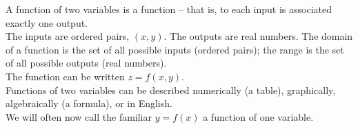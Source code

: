 \begin{tcolorbox}[title = {A Function of Two Variables}]

\noindent A function of two variables is a function – that is, to each input is associated exactly one output.\\

The inputs are ordered pairs, $(x, y)$. The outputs are real numbers. The domain of a function is the set of all possible inputs (ordered pairs); the range is the set of all possible outputs (real numbers).\\

The function can be written $z = f(x,y)$.\\

Functions of two variables can be described numerically (a table), graphically, algebraically (a formula), or in English.\\

We will often now call the familiar $y = f(x)$ a function of one variable.

\end{tcolorbox}

